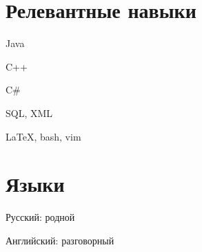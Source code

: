\section{Релевантные навыки}
\begin{innerlist}
  \item Java
  \item C++
  \item C$\#$
  \item SQL, XML
  \item \LaTeX, bash, vim
\end{innerlist}

\section{Языки}
\begin{innerlist}
  \item Русский: родной 
  \item Английский: разговорный 
\end{innerlist}
